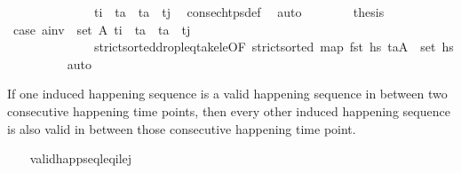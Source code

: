\begin{isabellebody}
\ \ \ \ \ \ \ \ \ \ \ \ \ \ {\isacartoucheopen}t\isactrlsub i{\isacharprime}{\kern0pt}\ {\isacharless}{\kern0pt}\ t\isactrlsub a{\isacharprime}{\kern0pt}\ {\isasymand}\ t\isactrlsub a{\isacharprime}{\kern0pt}\ {\isacharless}{\kern0pt}\ t\isactrlsub j{\isacharprime}{\kern0pt}{\isacartoucheclose}\ \isamarkupfalse%
\ consec{\isacharunderscore}{\kern0pt}htps{\isacharunderscore}{\kern0pt}def\ \isamarkupfalse%
\ auto\isanewline
\ \ \ \ \ \ \isamarkupfalse%
\ {\isacharquery}{\kern0pt}thesis\isanewline
\ \ \ \ \ \ \ \ \isamarkupfalse%
\ {\isacartoucheopen}{\isacharquery}{\kern0pt}case{}{\isacartoucheclose}\ {\isacartoucheopen}{\isacharquery}{\kern0pt}a\isactrlsub i\isactrlsub n\isactrlsub v\ {\isasymin}\ set\ A{\isacharprime}{\kern0pt}{\isacartoucheclose}\ {\isacartoucheopen}t\isactrlsub i\ {\isacharless}{\kern0pt}\ t\isactrlsub a{\isacharprime}{\kern0pt}\ {\isasymand}\ t\isactrlsub a{\isacharprime}{\kern0pt}\ {\isacharless}{\kern0pt}\ t\isactrlsub j{\isacartoucheclose}\isanewline
\ \ \ \ \ \ \ \ \ \ \ \ \ \ strict{\isacharunderscore}{\kern0pt}sorted{\isacharunderscore}{\kern0pt}drop{\isacharunderscore}{\kern0pt}leq{\isacharunderscore}{\kern0pt}take{\isacharunderscore}{\kern0pt}le{\isacharbrackleft}{\kern0pt}OF\ {\isacartoucheopen}strict{\isacharunderscore}{\kern0pt}sorted\ {\isacharparenleft}{\kern0pt}map\ fst\ hs\ {\isacartoucheopen}{\isacharparenleft}{\kern0pt}t\isactrlsub a{\isacharprime}{\kern0pt}{\isacharcomma}{\kern0pt}A{\isacharprime}{\kern0pt}{\isacharparenright}{\kern0pt}\ {\isasymin}\ set\ hs\isanewline
\ \ \ \ \ \ \ \ \isamarkupfalse%
\ auto\isanewline
\ \ \ \ \isamarkupfalse%
\isanewline
\ \ \isamarkupfalse%
%
\endisatagproof
{\isafoldproof}%
%
\isadelimproof
%
\endisadelimproof
%
\begin{isamarkuptext}%
If one induced happening sequence is a valid happening sequence in between two 
  consecutive happening time points, then every other induced happening sequence is 
  also valid in between those consecutive happening time point.%
\end{isamarkuptext}\isamarkuptrue%
\ \ \isamarkupfalse%
\ valid{\isacharunderscore}{\kern0pt}happ{\isacharunderscore}{\kern0pt}seq{\isacharunderscore}{\kern0pt}leq\isactrlsub i{\isacharunderscore}{\kern0pt}le\isactrlsub j{\isacharcolon}{\kern0pt}\isanewline

\end{isabellebody}
